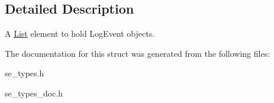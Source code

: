\subsection{Detailed Description}
A \hyperlink{structList}{List} element to hold Log\+Event objects. 

The documentation for this struct was generated from the following files\+:\begin{DoxyCompactItemize}
\item 
se\+\_\+types.\+h\item 
se\+\_\+types\+\_\+doc.\+h\end{DoxyCompactItemize}
